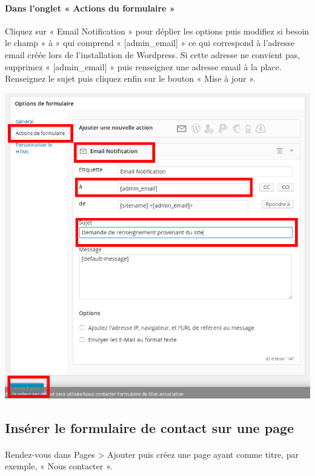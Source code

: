 \documentclass[10pt,a4paper]{article}
\begin{document}
\paragraph{Dans l'onglet « Actions du formulaire »} Cliquez sur « Email Notification » pour déplier les options puis modifiez si besoin le champ « à » qui comprend « [admin\_email] » ce qui correspond à l'adresse email créée lors de l'installation de Wordpress. Si cette adresse ne convient pas, supprimez « [admin\_email] » puis renseignez une adresse email à la place. Renseignez le sujet puis cliquez enfin sur le bouton « Mise à jour ».
\begin{center}
\includegraphics[scale=0.3]{img/0188.png}
\end{center}
\subsection{Insérer le formulaire de contact sur une page}
\paragraph{}Rendez-vous dans Pages > Ajouter puis créez une page ayant comme titre, par exemple, « Nous contacter ».
\end{document}
